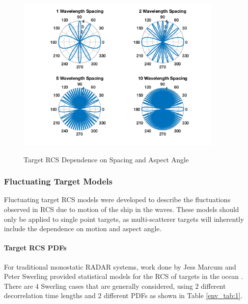 \begin{figure}[H]
  \begin{center}
\includegraphics[width=4in]{../media/multistatic/target_rcs_2_point.png}
  \end{center}
  \renewcommand{\baselinestretch}{1} \small\normalsize
  \begin{quote}
    \caption[Target RCS Dependence on Spacing and Aspect Angle]{Target RCS Dependence on Spacing and Aspect Angle\label{env_fig:3y}}
  \end{quote}
\end{figure}
\renewcommand{\baselinestretch}{2} \small\normalsize

\subsubsection{Fluctuating Target Models}\label{env_fluctuating_target_rcs}
Fluctuating target RCS models were developed to describe the fluctuations observed in RCS due to motion of the ship in the waves. These models should only be applied to single point targets, as multi-scatterer targets will inherently include the dependence on motion and aspect angle.

\paragraph{Target RCS PDFs}
For traditional monostatic RADAR systems, work done by Jess Marcum and Peter Swerling provided statistical models for the RCS of targets in the ocean \cite{richards_radar}. There are $4$ Swerling cases that are generally considered, using $2$ different decorrelation time lengths and $2$ different PDFs as shown in Table \ref{env_tab:1}. 

